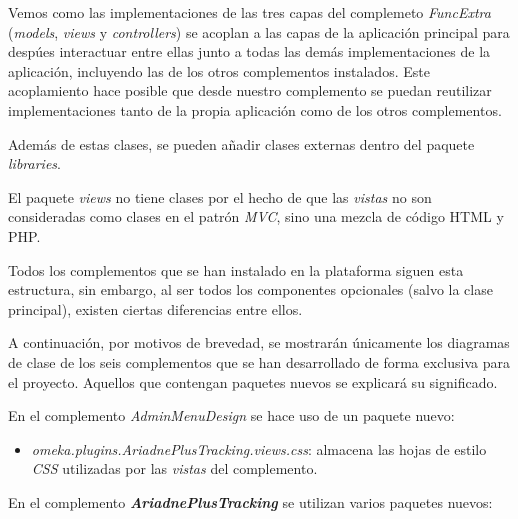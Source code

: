 Vemos como las implementaciones de las tres capas del complemeto
\emph{FuncExtra} (\emph{models}, \emph{views} y \emph{controllers}) se
acoplan a las capas de la aplicación principal para despúes interactuar
entre ellas junto a todas las demás implementaciones de la aplicación,
incluyendo las de los otros complementos instalados. Este acoplamiento
hace posible que desde nuestro complemento se puedan reutilizar
implementaciones tanto de la propia aplicación como de los otros
complementos.

Además de estas clases, se pueden añadir clases externas dentro del
paquete \emph{libraries}.

El paquete \emph{views} no tiene clases por el hecho de que las
\emph{vistas} no son consideradas como clases en el patrón \emph{MVC},
sino una mezcla de código HTML y PHP.

Todos los complementos que se han instalado en la plataforma siguen esta
estructura, sin embargo, al ser todos los componentes opcionales (salvo
la clase principal), existen ciertas diferencias entre ellos.

A continuación, por motivos de brevedad, se mostrarán únicamente los
diagramas de clase de los seis complementos que se han desarrollado de
forma exclusiva para el proyecto. Aquellos que contengan paquetes nuevos
se explicará su significado.


En el complemento \emph{AdminMenuDesign} se hace uso de un paquete
nuevo:

\begin{itemize}
\tightlist
\item
  \emph{omeka.plugins.AriadnePlusTracking.views.css}: almacena las hojas
  de estilo \emph{CSS} utilizadas por las \emph{vistas} del complemento.
\end{itemize}


En el complemento \textbf{\emph{AriadnePlusTracking}} se utilizan varios paquetes
nuevos:


